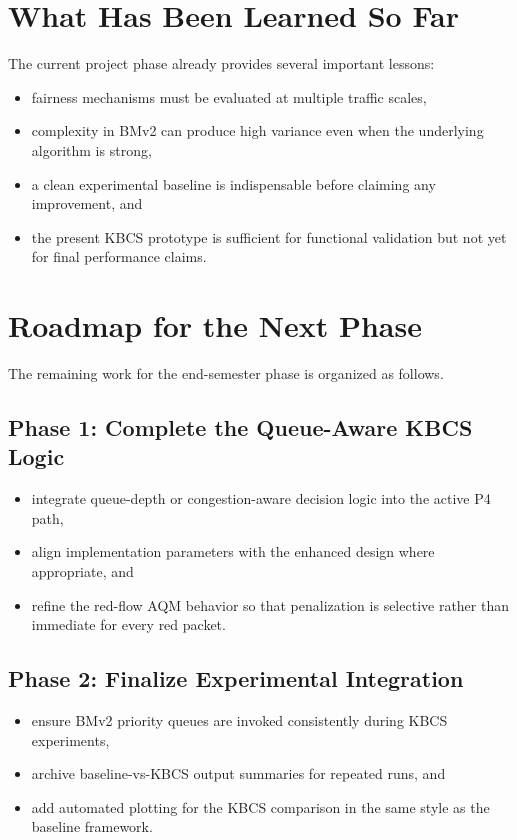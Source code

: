 \documentclass[12pt,a4paper]{report}
\begin{document}
\section{What Has Been Learned So Far}
The current project phase already provides several important lessons:
\begin{itemize}
    \item fairness mechanisms must be evaluated at multiple traffic scales,
    \item complexity in BMv2 can produce high variance even when the underlying algorithm is strong,
    \item a clean experimental baseline is indispensable before claiming any improvement, and
    \item the present KBCS prototype is sufficient for functional validation but not yet for final performance claims.
\end{itemize}

\section{Roadmap for the Next Phase}
The remaining work for the end-semester phase is organized as follows.

\subsection{Phase 1: Complete the Queue-Aware KBCS Logic}
\begin{itemize}
    \item integrate queue-depth or congestion-aware decision logic into the active P4 path,
    \item align implementation parameters with the enhanced design where appropriate, and
    \item refine the red-flow AQM behavior so that penalization is selective rather than immediate for every red packet.
\end{itemize}

\subsection{Phase 2: Finalize Experimental Integration}
\begin{itemize}
    \item ensure BMv2 priority queues are invoked consistently during KBCS experiments,
    \item archive baseline-vs-KBCS output summaries for repeated runs, and
    \item add automated plotting for the KBCS comparison in the same style as the baseline framework.
\end{itemize}
\end{document}
